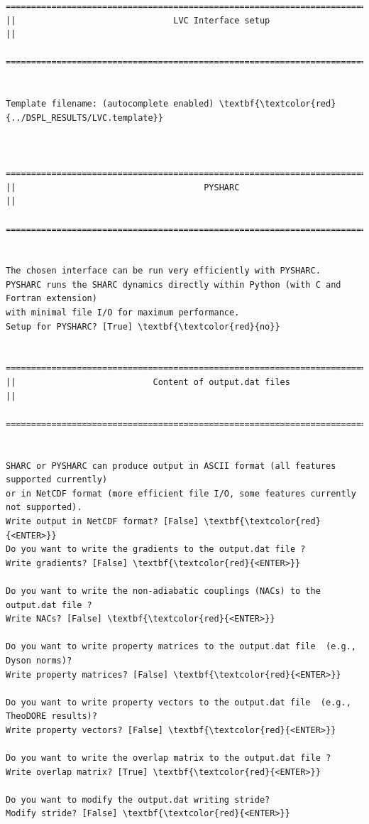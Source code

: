 \documentclass[a4paper,11pt,DIV=15,openany]{scrbook}
\begin{document}
\begin{oframed}
\begin{Verbatim}[commandchars=\\\{\}]
  ================================================================================
||                               LVC Interface setup                              ||
  ================================================================================


Template filename: (autocomplete enabled) \textbf{\textcolor{red}{../DSPL_RESULTS/LVC.template}}


  ================================================================================
||                                     PYSHARC                                    ||
  ================================================================================


The chosen interface can be run very efficiently with PYSHARC.
PYSHARC runs the SHARC dynamics directly within Python (with C and Fortran extension)
with minimal file I/O for maximum performance.
Setup for PYSHARC? [True] \textbf{\textcolor{red}{no}}

  ================================================================================
||                           Content of output.dat files                          ||
  ================================================================================


SHARC or PYSHARC can produce output in ASCII format (all features supported currently)
or in NetCDF format (more efficient file I/O, some features currently not supported).
Write output in NetCDF format? [False] \textbf{\textcolor{red}{<ENTER>}}
Do you want to write the gradients to the output.dat file ?
Write gradients? [False] \textbf{\textcolor{red}{<ENTER>}}

Do you want to write the non-adiabatic couplings (NACs) to the output.dat file ?
Write NACs? [False] \textbf{\textcolor{red}{<ENTER>}}

Do you want to write property matrices to the output.dat file  (e.g., Dyson norms)?
Write property matrices? [False] \textbf{\textcolor{red}{<ENTER>}}

Do you want to write property vectors to the output.dat file  (e.g., TheoDORE results)?
Write property vectors? [False] \textbf{\textcolor{red}{<ENTER>}}

Do you want to write the overlap matrix to the output.dat file ?
Write overlap matrix? [True] \textbf{\textcolor{red}{<ENTER>}}

Do you want to modify the output.dat writing stride?
Modify stride? [False] \textbf{\textcolor{red}{<ENTER>}}



\end{Verbatim}
\end{oframed}
\end{document}
